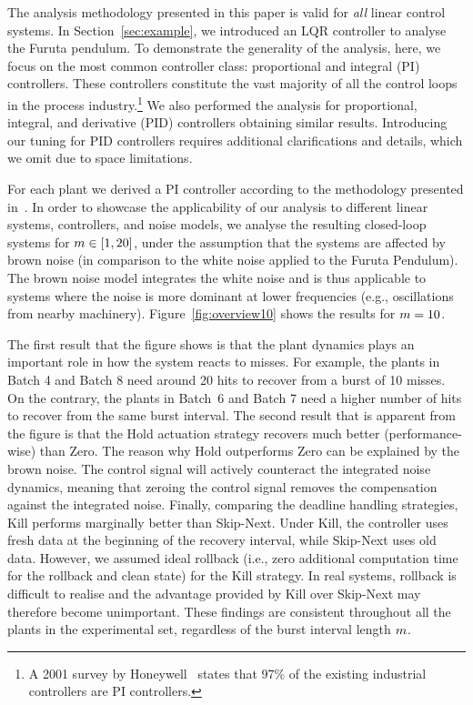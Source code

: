 The analysis methodology presented in this paper is valid for \emph{all} linear control systems. 
In Section~\ref{sec:example}, we introduced an LQR controller to analyse the Furuta pendulum. To demonstrate the generality of the analysis, here, we focus on the most common controller class: proportional and integral (PI) controllers. 
These controllers constitute the vast majority of all the control loops in the process industry.\footnote{A 2001 survey by Honeywell~\cite{Desborough2001} states that 97\% of the existing industrial controllers are PI controllers.}  
We also performed the analysis for proportional, integral, and derivative (PID) controllers obtaining similar results. 
Introducing our tuning for PID controllers requires additional clarifications and details, which we omit due to space limitations.

For each plant we derived a PI controller according to the methodology presented in~\cite{Garpinger:2015}.
In order to showcase the applicability of our analysis to different linear systems, controllers, and noise models, we analyse the resulting closed-loop systems for $m \in [1,20]$, under the assumption that the systems are affected by brown noise (in comparison to the white noise applied to the Furuta Pendulum).
The brown noise model integrates the white noise and is thus applicable to systems where the noise is more dominant at lower frequencies (e.g., oscillations from nearby machinery).
Figure~\ref{fig:overview10} shows the results for $m=10$. 

The first result that the figure shows is that the plant dynamics plays an important role in how the system reacts to misses. 
For example, the plants in Batch 4 and Batch 8 need around 20 hits to recover from a burst of 10 misses. 
On the contrary, the plants in Batch~6 and Batch 7 need a higher number of hits to recover from the same burst interval. 
The second result that is apparent from the figure is that the Hold actuation strategy recovers much better (performance-wise) than Zero.
The reason why Hold outperforms Zero can be explained by the brown noise.
The control signal will actively counteract the integrated noise dynamics, meaning that zeroing the control signal removes the compensation against the integrated noise.
%
Finally, comparing the deadline handling strategies, Kill performs marginally better than Skip-Next. 
Under Kill, the controller uses fresh data at the beginning of the recovery interval, while Skip-Next uses old data.  
However, we assumed ideal rollback (i.e., zero additional computation time for the rollback and clean state) for the Kill strategy. 
In real systems, rollback is difficult to realise and the advantage provided by Kill over Skip-Next may therefore become unimportant.
%
These findings are consistent throughout all the plants in the experimental set, regardless of the burst interval length $m$.

